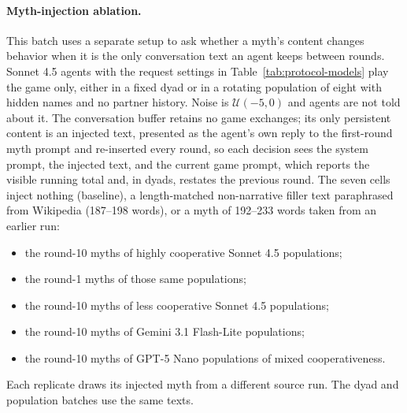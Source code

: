 \paragraph{Myth-injection ablation.}\label{sec:protocol-ablation} This batch uses a separate setup to ask whether a myth's content changes behavior when it is the only conversation text an agent keeps between rounds. Sonnet 4.5 agents with the request settings in Table~\ref{tab:protocol-models} play the game only, either in a fixed dyad or in a rotating population of eight with hidden names and no partner history. Noise is $\mathcal{U}(-5,0)$ and agents are not told about it. The conversation buffer retains no game exchanges; its only persistent content is an injected text, presented as the agent's own reply to the first-round myth prompt and re-inserted every round, so each decision sees the system prompt, the injected text, and the current game prompt, which reports the visible running total and, in dyads, restates the previous round. The seven cells inject nothing (baseline), a length-matched non-narrative filler text paraphrased from Wikipedia (187--198 words), or a myth of 192--233 words taken from an earlier run:
\begin{itemize}
\item the round-10 myths of highly cooperative Sonnet 4.5 populations;
\item the round-1 myths of those same populations;
\item the round-10 myths of less cooperative Sonnet 4.5 populations;
\item the round-10 myths of Gemini 3.1 Flash-Lite populations;
\item the round-10 myths of GPT-5 Nano populations of mixed cooperativeness.
\end{itemize}
Each replicate draws its injected myth from a different source run. The dyad and population batches use the same texts.

